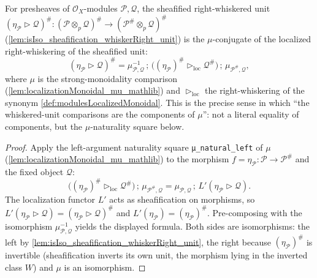 \begin{lemma}
  \label{lem:whiskeredUnit_eq_localizationMu}
  For presheaves of \(\mathcal{O}_X\)-modules \(\mathcal{P}, \mathcal{Q}\), the
  sheafified right-whiskered unit
  \((\eta_{\mathcal{P}} \rhd \mathcal{Q})^{\#} :
    (\mathcal{P} \otimes_p \mathcal{Q})^{\#}
    \to (\mathcal{P}^{\#} \otimes_p \mathcal{Q})^{\#}\)
  (\cref{lem:isIso_sheafification_whiskerRight_unit}) is the \(\mu\)-conjugate of
  the localized right-whiskering of the sheafified unit:
  \[
    (\eta_{\mathcal{P}} \rhd \mathcal{Q})^{\#}
      = \mu_{\mathcal{P},\mathcal{Q}}^{-1} \,;\,
        \bigl((\eta_{\mathcal{P}})^{\#} \rhd_{\mathrm{loc}} \mathcal{Q}^{\#}\bigr)
        \,;\, \mu_{\mathcal{P}^{\#},\mathcal{Q}},
  \]
  where \(\mu\) is the strong-monoidality comparison
  (\cref{lem:localizationMonoidal_mu_mathlib}) and \(\rhd_{\mathrm{loc}}\) the
  right-whiskering of the synonym \cref{def:modulesLocalizedMonoidal}. This is the
  precise sense in which ``the whiskered-unit comparisons are the components of
  \(\mu\)'': not a literal equality of components, but the \(\mu\)-naturality
  square below.
\end{lemma}

\begin{proof}
  Apply the left-argument naturality square \texttt{μ\_natural\_left} of \(\mu\)
  (\cref{lem:localizationMonoidal_mu_mathlib}) to the morphism
  \(f = \eta_{\mathcal{P}} : \mathcal{P} \to \mathcal{P}^{\#}\) and the fixed
  object \(\mathcal{Q}\):
  \[
    \bigl((\eta_{\mathcal{P}})^{\#} \rhd_{\mathrm{loc}} \mathcal{Q}^{\#}\bigr)
      \,;\, \mu_{\mathcal{P}^{\#},\mathcal{Q}}
      = \mu_{\mathcal{P},\mathcal{Q}} \,;\,
        L'(\eta_{\mathcal{P}} \rhd \mathcal{Q}).
  \]
  The localization functor \(L'\) acts as sheafification on morphisms, so
  \(L'(\eta_{\mathcal{P}} \rhd \mathcal{Q}) = (\eta_{\mathcal{P}} \rhd
  \mathcal{Q})^{\#}\) and \(L'(\eta_{\mathcal{P}}) = (\eta_{\mathcal{P}})^{\#}\).
  Pre-composing with the isomorphism \(\mu_{\mathcal{P},\mathcal{Q}}^{-1}\) yields
  the displayed formula. Both sides are isomorphisms: the left by
  \cref{lem:isIso_sheafification_whiskerRight_unit}, the right because
  \((\eta_{\mathcal{P}})^{\#}\) is invertible (sheafification inverts its own unit,
  the morphism lying in the inverted class \(W\)) and \(\mu\) is an isomorphism.
\end{proof}

